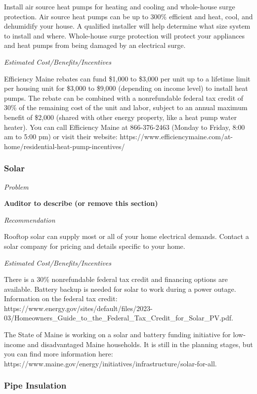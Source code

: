 \documentclass[
  letterpaper,
  DIV=11,
  numbers=noendperiod]{scrartcl}
\begin{document}
Install air source heat pumps for heating and cooling and whole-house
surge protection. Air source heat pumps can be up to 300\% efficient and
heat, cool, and dehumidify your house. A qualified installer will help
determine what size system to install and where. Whole-house surge
protection will protect your appliances and heat pumps from being
damaged by an electrical surge.

\emph{Estimated Cost/Benefits/Incentives}

Efficiency Maine rebates can fund \$1,000 to \$3,000 per unit up to a
lifetime limit per housing unit for \$3,000 to \$9,000 (depending on
income level) to install heat pumps. The rebate can be combined with a
nonrefundable federal tax credit of 30\% of the remaining cost of the
unit and labor, subject to an annual maximum benefit of \$2,000 (shared
with other energy property, like a heat pump water heater). You can call
Efficiency Maine at 866-376-2463 (Monday to Friday, 8:00 am to 5:00 pm)
or visit their website:
https://www.efficiencymaine.com/at-home/residential-heat-pump-incentives/

\subsubsection{Solar}\label{solar}

\emph{Problem}

\textbf{Auditor to describe (or remove this section)}

\emph{Recommendation}

Rooftop solar can supply most or all of your home electrical demands.
Contact a solar company for pricing and details specific to your home.

\emph{Estimated Cost/Benefits/Incentives}

There is a 30\% nonrefundable federal tax credit and financing options
are available. Battery backup is needed for solar to work during a power
outage. Information on the federal tax credit:
https://www.energy.gov/sites/default/files/2023-03/Homeowners\_Guide\_to\_the\_Federal\_Tax\_Credit\_for\_Solar\_PV.pdf.

The State of Maine is working on a solar and battery funding initiative
for low-income and disadvantaged Maine households. It is still in the
planning stages, but you can find more information here:
https://www.maine.gov/energy/initiatives/infrastructure/solar-for-all.

\subsubsection{Pipe Insulation}\label{pipe-insulation}
\end{document}

